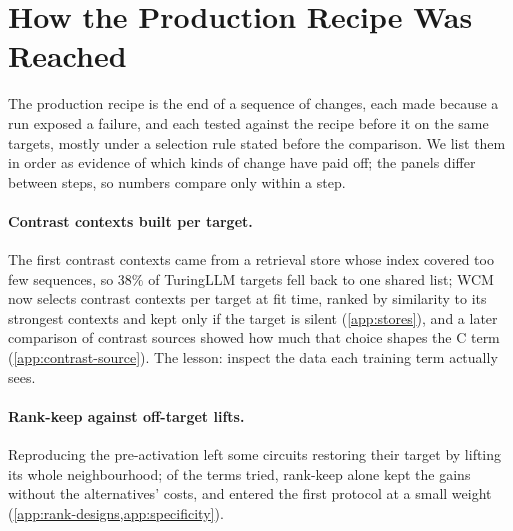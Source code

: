 \section{How the Production Recipe Was Reached}
\label{app:framework-history}
The production recipe is the end of a sequence of changes, each made because a run exposed a failure, and each tested against the recipe before it on the same targets, mostly under a selection rule stated before the comparison.
We list them in order as evidence of which kinds of change have paid off; the panels differ between steps, so numbers compare only within a step.

\paragraph{Contrast contexts built per target.}
The first contrast contexts came from a retrieval store whose index covered too few sequences, so $38\%$ of TuringLLM targets fell back to one shared list; WCM now selects contrast contexts per target at fit time, ranked by similarity to its strongest contexts and kept only if the target is silent (\cref{app:stores}), and a later comparison of contrast sources showed how much that choice shapes the C term (\cref{app:contrast-source}).
The lesson: inspect the data each training term actually sees.

\paragraph{Rank-keep against off-target lifts.}
Reproducing the pre-activation left some circuits restoring their target by lifting its whole neighbourhood; of the terms tried, rank-keep alone kept the gains without the alternatives' costs, and entered the first protocol at a small weight (\cref{app:rank-designs,app:specificity}).

